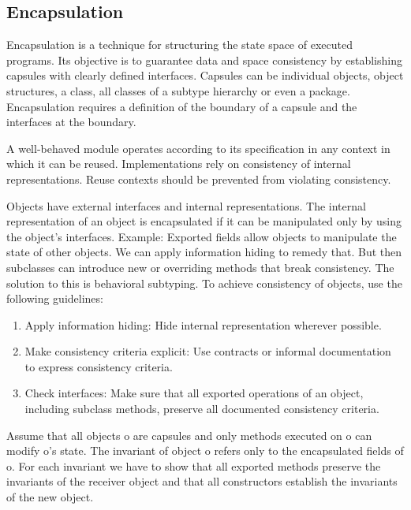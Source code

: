 \subsection{Encapsulation}
\begin{mytitle}[Encapsulation] Encapsulation is a technique for structuring the state space of executed programs. Its objective is to guarantee data and space consistency by establishing capsules with clearly defined interfaces. Capsules can be individual objects, object structures, a class, all classes of a subtype hierarchy or even a package. Encapsulation requires a definition of the boundary of a capsule and the interfaces at the boundary.
\end{mytitle}
\begin{mytitle}[Objective] A well-behaved module operates according to its specification in any context in which it can be reused. Implementations rely on consistency of internal representations. Reuse contexts should be prevented from violating consistency.
\end{mytitle}
\begin{mytitle} Objects have external interfaces and internal representations. The internal representation of an object is encapsulated if it can be manipulated only by using the object's interfaces. Example: Exported fields allow objects to manipulate the state of other objects. We can apply information hiding to remedy that. But then subclasses can introduce new or overriding methods that break consistency. The solution to this is behavioral subtyping. To achieve consistency of objects, use the following guidelines:
\begin{enumerate}
    \item Apply information hiding: Hide internal representation wherever possible.
    \item Make consistency criteria explicit: Use contracts or informal documentation to express consistency criteria.
    \item Check interfaces: Make sure that all exported operations of an object, including subclass methods, preserve all documented consistency criteria.
\end{enumerate}
\end{mytitle}
\begin{mytitle} Assume that all objects o are capsules and only methods executed on o can modify o's state. The invariant of object o refers only to the encapsulated fields of o. For each invariant we have to show that all exported methods preserve the invariants of the receiver object and that all constructors establish the invariants of the new object. 
\end{mytitle}
